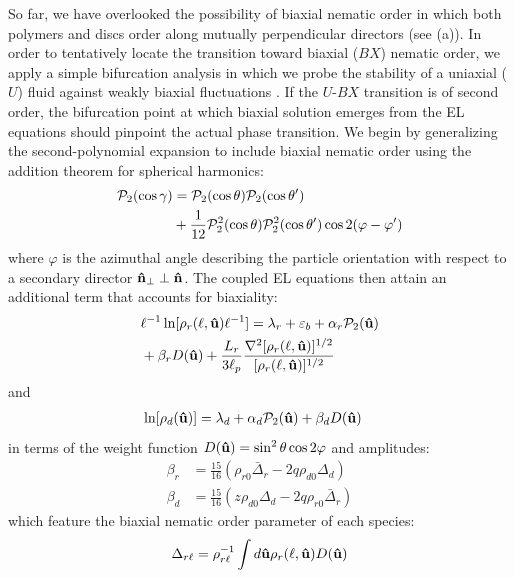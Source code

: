 \begin{subappendices}
So far, we have overlooked the possibility of biaxial nematic order in which both polymers and discs order along mutually perpendicular directors (see (a)).
In order to tentatively locate the transition toward biaxial ($BX$) nematic order, we  apply a simple bifurcation analysis in which we probe the stability of a uniaxial ($U$) fluid against weakly biaxial fluctuations \cite{kayser,stroobants1984}. If the $U$-$BX$ transition is of second order, the bifurcation point at which biaxial solution emerges from the EL equations should pinpoint the actual phase transition.  We begin by generalizing the second-polynomial expansion  to include biaxial nematic order using the addition theorem for spherical harmonics:
\begin{align}
{\mathcal P}_{2}( \cos \gamma ) &= {\mathcal P}_{2}(\cos \theta) {\mathcal P}_{2}(\cos \theta^{\prime})  \nonumber \\ 
& + \frac{1}{12} {\mathcal P}_{2}^{2}(\cos \theta) {\mathcal P}_{2}^{2}(\cos \theta^{\prime}) \cos 2 (\varphi - \varphi^{\prime})
\end{align}
where $\varphi$ is the azimuthal angle describing the particle orientation  with respect to a secondary director ${\bf \hat{n}}_{\perp} \perp {\bf \hat{n}}$. The coupled EL equations then attain an additional term that accounts for biaxiality:
\begin{align}
&  \ell^{-1} \ln [  \rho_{r} (\ell, {\bf \hat{u}} ) \ell^{-1} ]   = \lambda_{r}    + \varepsilon_{b}  +  \alpha_{r}  {\mathcal P}_{2}({\bf \hat{u}} ) \nonumber \\ 
& +  \beta_{r } D({\bf \hat{u}})   +  \frac{L_{r}}{3\ell_{p}} \frac{\nabla^{2} [ \rho_{r} (\ell , {\bf \hat{u}})]^{1/2}}{ [ \rho_{r} (\ell , {\bf \hat{u}})]^{1/2} }
\label{lnrhorbiax}
\end{align}
and
\begin{align}
\ln [  \rho_{d} ({\bf \hat{u}} )] & = \lambda_{d}  + \alpha_{d} {\mathcal P}_{2}({\bf \hat{u}})  + \beta_{d} D({\bf \hat{u}} )  
\label{lndbiax}
\end{align}
in terms of the  weight function $D({\bf \hat{u}}) = \sin^{2} \theta  \cos 2 \varphi $ and amplitudes: 
\begin{align}
\beta_{r} &=  \frac{15 }{16}  ( \rho_{r0} \bar{\Delta}_{r}  - 2q  \rho_{d0}  \Delta_{d} )  \nonumber \\
\beta_{d} &=   \frac{15 }{16}  (z \rho_{d0}  \Delta_{d}  - 2 q \rho_{r0}  \bar{\Delta}_{r} )
\label{alphabetabiax}
\end{align}
which feature the biaxial nematic order parameter of each species:
\begin{align}
\Delta_{r \ell} &= \rho_{r \ell}^{-1} \int d \oma \rho_{r}(\ell, \oma) D (\oma) \nonumber \\

\end{align}
\end{subappendices}
